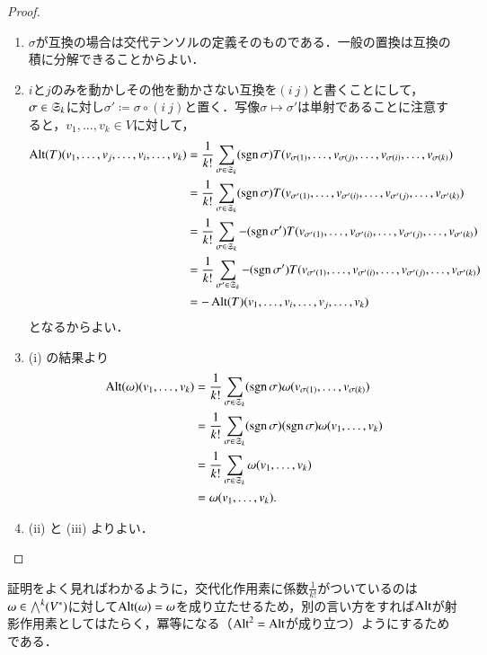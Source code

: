 \begin{proof}
\leavevmode
\begin{enumerate}
\item $\sigma$が互換の場合は交代テンソルの定義そのものである．一般の置換は互換の積に分解できることからよい．
\item $i$と$j$のみを動かしその他を動かさない互換を$(i \ j)$と書くことにして，$\sigma \in \mathfrak{S}_k$に対し$\sigma' \coloneqq \sigma \circ (i \ j)$と置く．写像$\sigma \mapsto \sigma'$は単射であることに注意すると，$v_1, \dots, v_k \in V$に対して，
\begin{align}
\operatorname{Alt}(T)(v_1, \dots, v_j, \dots, v_i, \dots, v_k) &= \frac{1}{k!} \sum_{\sigma \in \mathfrak{S}_k} (\operatorname{sgn} \sigma) T(v_{\sigma(1)}, \dots, v_{\sigma(j)}, \dots, v_{\sigma(i)}, \dots, v_{\sigma(k)}) \\
&= \frac{1}{k!} \sum_{\sigma \in \mathfrak{S}_k} (\operatorname{sgn}\sigma)T(v_{\sigma'(1)}, \dots, v_{\sigma'(i)}, \dots, v_{\sigma'(j)}, \dots, v_{\sigma'(k)}) \\
&= \frac{1}{k!} \sum_{\sigma \in \mathfrak{S}_k} -(\operatorname{sgn}\sigma')T(v_{\sigma'(1)}, \dots, v_{\sigma'(i)}, \dots, v_{\sigma'(j)}, \dots, v_{\sigma'(k)}) \\
&= \frac{1}{k!} \sum_{\sigma' \in \mathfrak{S}_k} -(\operatorname{sgn}\sigma')T(v_{\sigma'(1)}, \dots, v_{\sigma'(i)}, \dots, v_{\sigma'(j)}, \dots, v_{\sigma'(k)}) \\
&= -\operatorname{Alt}(T)(v_1, \dots, v_i, \dots, v_j, \dots, v_k)
\end{align}となるからよい．
\item (i) の結果より
\begin{align}
\operatorname{Alt}(\omega) (v_1, \dots, v_k) &= \frac{1}{k!} \sum_{\sigma \in \mathfrak{S}_k} (\operatorname{sgn} \sigma )\omega(v_{\sigma(1)}, \dots, v_{\sigma(k)}) \\
&= \frac{1}{k!} \sum_{\sigma \in \mathfrak{S}_k} (\operatorname{sgn} \sigma )(\operatorname{sgn} \sigma)\omega(v_1, \dots, v_k) \\
&= \frac{1}{k!} \sum_{\sigma \in \mathfrak{S}_k} \omega(v_1, \dots, v_k) \\
&= \omega(v_1,\dots,v_k).
\end{align}
\item (ii) と (iii) よりよい．
\end{enumerate}
\end{proof}

\begin{dig}
証明をよく見ればわかるように，交代化作用素に係数$\frac{1}{k!}$がついているのは$\omega \in \bigwedge^k(V^*)$に対して$\operatorname{Alt}(\omega) = \omega$を成り立たせるため，別の言い方をすれば$\operatorname{Alt}$が射影作用素としてはたらく，冪等になる（$\operatorname{Alt}^2 = \operatorname{Alt}$が成り立つ）ようにするためである．
\end{dig}

